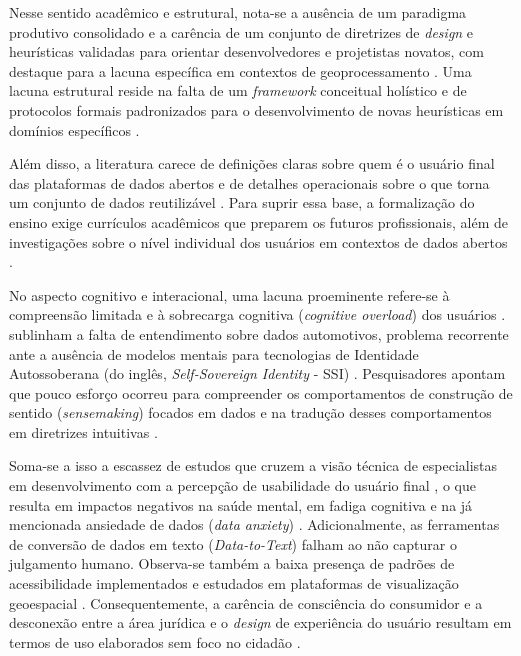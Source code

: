 \documentclass[
	12pt,				%
	oneside,			%
	a4paper,			%
	english,			%
	brazil				%
	]{abntex2ppgsi}
\begin{document}
    Nesse sentido acadêmico e estrutural, nota-se a ausência de um paradigma produtivo consolidado e a carência de um conjunto de diretrizes de \textit{design} e heurísticas validadas para orientar desenvolvedores e projetistas novatos, com destaque para a lacuna específica em contextos de geoprocessamento \cite{Capeleti2024Human, Belizario2023Interacao, chalhoub2024useful, Zou2020769, Victorelli2020Human}. Uma lacuna estrutural reside na falta de um \textit{framework} conceitual holístico e de protocolos formais padronizados para o desenvolvimento de novas heurísticas em domínios específicos \cite{Capeleti2024Human, Strey2019Human, barcellos2022towards, Hornung2015, Elhamdadi2022, Roberts2017343}. 

    Além disso, a literatura carece de definições claras sobre quem é o usuário final das plataformas de dados abertos e de detalhes operacionais sobre o que torna um conjunto de dados reutilizável \cite{Belizario2023Interacao, Koesten2021, Koesten2020}. Para suprir essa base, a formalização do ensino exige currículos acadêmicos que preparem os futuros profissionais, além de investigações sobre o nível individual dos usuários em contextos de dados abertos \cite{mu2024institutional, coleti2024human, Locoro2020}.

    No aspecto cognitivo e interacional, uma lacuna proeminente refere-se à compreensão limitada e à sobrecarga cognitiva (\textit{cognitive overload}) dos usuários \cite{Locoro2020}.  sublinham a falta de entendimento sobre dados automotivos, problema recorrente ante a ausência de modelos mentais para tecnologias de Identidade Autossoberana (do inglês, \textit{Self-Sovereign Identity} - SSI) \cite{Lockwood2021, Lockwood2020AnAccessible}. Pesquisadores apontam que pouco esforço ocorreu para compreender os comportamentos de construção de sentido (\textit{sensemaking}) focados em dados e na tradução desses comportamentos em diretrizes intuitivas \cite{Koesten2021, Xiao2021}.

    Soma-se a isso a escassez de estudos que cruzem a visão técnica de especialistas em desenvolvimento com a percepção de usabilidade do usuário final \cite{Capeleti2024Human}, o que resulta em impactos negativos na saúde mental, em fadiga cognitiva e na já mencionada ansiedade de dados (\textit{data anxiety}) \cite{cezar2023cognitive}. Adicionalmente, as ferramentas de conversão de dados em texto (\textit{Data-to-Text}) falham ao não capturar o julgamento humano. Observa-se também a baixa presença de padrões de acessibilidade implementados e estudados em plataformas de visualização geoespacial \cite{Capeleti2024Human, ferreira2024connecting, Haghighati2020, Koesten2020Everything, JoseViterbo2020}. Consequentemente, a carência de consciência do consumidor e a desconexão entre a área jurídica e o \textit{design} de experiência do usuário resultam em termos de uso elaborados sem foco no cidadão \cite{Coleti2019DesigPatterns, Jones2017, Mashhadi2014}.
\end{document}
